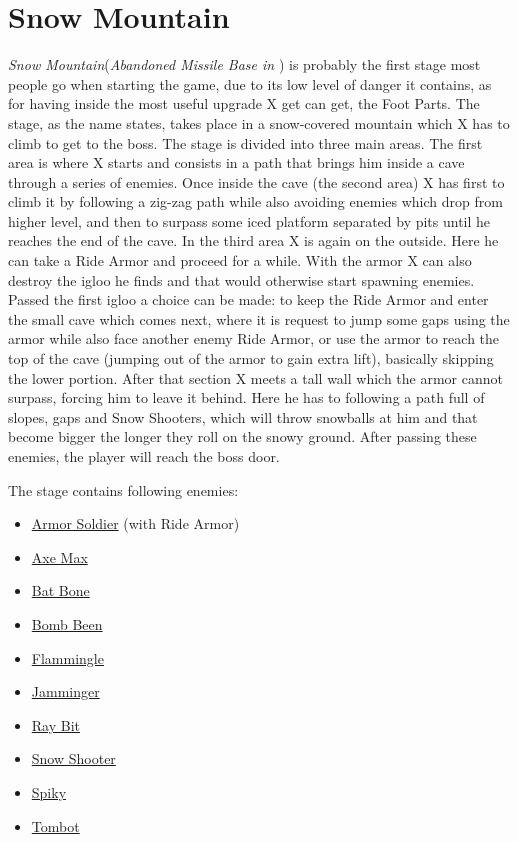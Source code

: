 \section{Snow Mountain}
\textit{Snow Mountain}(\textit{Abandoned Missile Base in \mhx}) is probably the first stage most people go when starting the game, due to its low level of danger it contains\cite{stratwiki:Snow_mountain}, as for having inside the most useful upgrade X get can get, the Foot Parts. The stage, as the name states, takes place in a snow-covered mountain which X has to climb to get to the boss. The stage is divided into three main areas. The first area is where X starts and consists in a path that brings him inside a cave through a series of enemies. Once inside the cave (the second area) X has first to climb it by following a zig-zag path while also avoiding enemies which drop from higher level, and then to surpass some iced platform separated by pits until he reaches the end of the cave. In the third area X is again on the outside. Here he can take a Ride Armor and proceed for a while. With the armor X can also destroy the igloo he finds and that would otherwise start spawning enemies. Passed the first igloo a choice can be made: to keep the Ride Armor and enter the small cave which comes next, where it is request to jump some gaps using the armor while also face another enemy Ride Armor, or use the armor to reach the top of the cave (jumping out of the armor to gain extra lift), basically skipping the lower portion. After that section X meets a tall wall which the armor cannot surpass, forcing him to leave it behind. Here he has to following a path full of slopes, gaps and Snow Shooters, which will throw snowballs at him and that become bigger the longer they roll on the snowy ground. After passing these enemies, the player will reach the boss door.

The stage contains following enemies\cite{wiki:Snow_mountain}:
\begin{itemize}
	\item \hyperlink{enem:Armor_Soldier}{Armor Soldier} (with Ride Armor)
	\item \hyperlink{enem:Axe_Max}{Axe Max}
	\item \hyperlink{enem:Bat_Bone}{Bat Bone}
	\item \hyperlink{enem:Bomb_Been}{Bomb Been}
	\item \hyperlink{enem:Flammingle}{Flammingle}
	\item \hyperlink{enem:Jamminger}{Jamminger }
	\item \hyperlink{enem:Ray_Bit}{Ray Bit}
	\item \hyperlink{enem:Snow_Shooter}{Snow Shooter}
	\item \hyperlink{enem:Spiky}{Spiky}
	\item \hyperlink{enem:Tombot}{Tombot}
\end{itemize}

